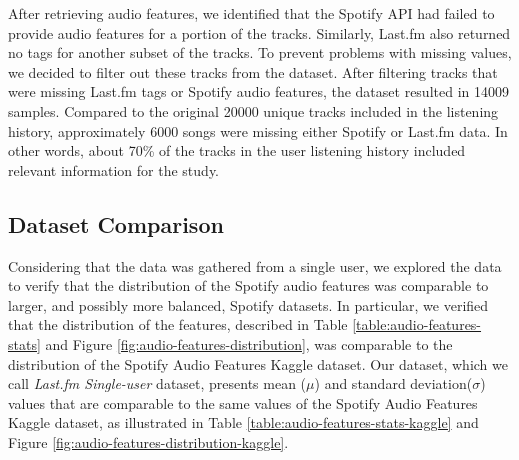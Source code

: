 \documentclass[sn-mathphys]{sn-jnl}%
\theoremstyle{thmstyleone}%
\theoremstyle{thmstyletwo}%
\theoremstyle{thmstylethree}%
\begin{document}
After retrieving audio features, we identified that the Spotify API had failed to provide audio features for a portion of the tracks.
Similarly, Last.fm also returned no tags for another subset of the tracks.
To prevent problems with missing values, we decided to filter out these tracks from the dataset.
After filtering tracks that were missing Last.fm tags or Spotify audio features,
the dataset resulted in \num{14009} samples.
Compared to the original \num{20000} unique tracks included in the listening history, approximately \num{6000} songs were missing either Spotify or Last.fm data.
In other words, about 70\% of the tracks in the user listening history included relevant information for the study.




\subsection{Dataset Comparison}

Considering that the data was gathered from a single user,
we explored the data to verify that the distribution of the Spotify audio features
was comparable to larger, and possibly more balanced, Spotify datasets.
In particular, we verified that the distribution of the features,
described in Table \ref{table:audio-features-stats} and Figure \ref{fig:audio-features-distribution},
was comparable to the distribution of the Spotify Audio Features Kaggle dataset.
Our dataset, which we call \emph{Last.fm Single-user} dataset, presents mean ($\mu$) and standard deviation($\sigma$) values that are comparable to the same values of the Spotify Audio Features Kaggle dataset,
as illustrated in Table \ref{table:audio-features-stats-kaggle}
and Figure \ref{fig:audio-features-distribution-kaggle}.

\end{document}
